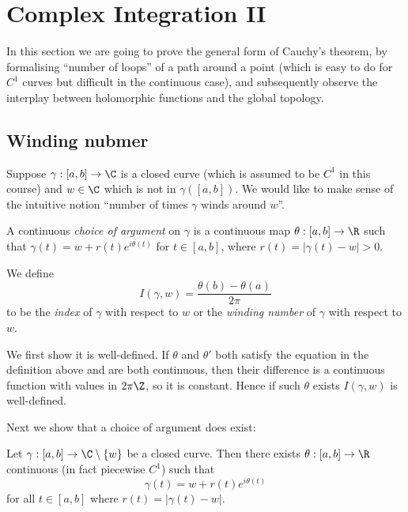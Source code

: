 \documentclass[a4paper]{article}
\begin{document}
\section{Complex Integration II}

In this section we are going to prove the general form of Cauchy's theorem, by formalising ``number of loops'' of a path around a point (which is easy to do for \(C^1\) curves but difficult in the continuous case), and subsequently observe the interplay between holomorphic functions and the global topology.

\subsection{Winding nubmer}

Suppose \(\gamma: [a, b] \to \C\) is a closed curve (which is assumed to be \(C^1\) in this course) and \(w \in \C\) which is not in \(\gamma([a, b])\). We would like to make sense of the intuitive notion ``number of times \(\gamma\) winds around \(w\)''.

\begin{definition}
  A continuous \emph{choice of argument} on \(\gamma\) is a continuous map \(\theta: [a, b] \to \R\) such that \(\gamma(t) = w + r(t)e^{i\theta(t)}\) for \(t \in [a, b]\), where \(r(t) = |\gamma(t) - w| > 0\).
\end{definition}

\begin{definition}
  We define
  \[
    I(\gamma, w) = \frac{\theta(b) - \theta(a)}{2\pi}
  \]
  to be the \emph{index} of \(\gamma\) with respect to \(w\) or the \emph{winding number} of \(\gamma\) with respect to \(w\).
\end{definition}

We first show it is well-defined. If \(\theta\) and \(\theta'\) both satisfy the equation in the definition above and are both continuous, then their difference is a continuous function with values in \(2\pi\Z\), so it is constant. Hence if such \(\theta\) exists \(I(\gamma, w)\) is well-defined.

Next we show that a choice of argument does exist:

\begin{lemma}
  Let \(\gamma: [a, b] \to \C \setminus \{w\}\) be a closed curve. Then there exists \(\theta: [a, b] \to \R\) continuous (in fact piecewise \(C^1\)) such that
  \[
    \gamma(t) = w + r(t) e^{i\theta(t)}
  \]
  for all \(t \in [a, b]\) where \(r(t) = |\gamma(t) - w|\).
\end{lemma}
\end{document}

